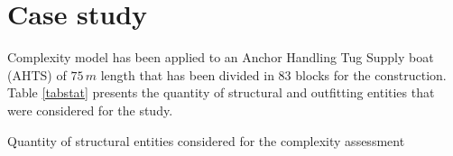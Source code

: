 \section{Case study}
Complexity model has been applied to an Anchor Handling Tug Supply boat (AHTS) of $75 \, m$ length that has been divided in 83 blocks for the construction. Table \ref{tabstat} presents the quantity of structural and outfitting entities that were considered for the study.


\begin{table}
\caption{Quantity of structural entities considered for the complexity assessment}
\label{tabstat}
\begin{center}

\end{center}
\end{table}
